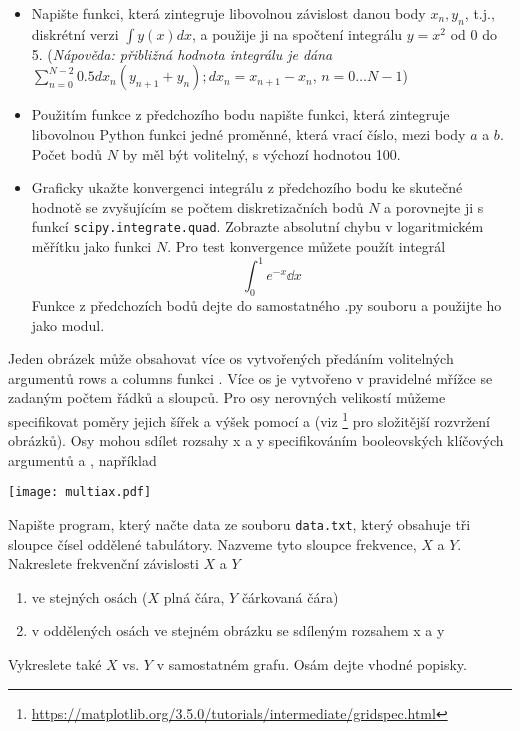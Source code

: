 \begin{exercise}
    \begin{itemize}
    \item Napište funkci, která zintegruje libovolnou závislost danou body $x_n, y_n$, t.j., diskrétní verzi $\int y(x)dx$, a použije ji na spočtení integrálu $y = x^2$ od 0 do 5. (\emph{Nápověda: přibližná hodnota integrálu je dána $\sum_{n=0}^{N-2} 0.5 dx_n(y_{n+1} + y_n); dx_n = x_{n+1} - x_n$}, $n = 0 \dots N-1$)

    \item Použitím funkce z předchozího bodu napište funkci, která zintegruje libovolnou Python funkci jedné proměnné, která vrací číslo, mezi body $a$ a $b$. Počet bodů $N$ by měl být volitelný, s výchozí hodnotou 100.

    \item Graficky ukažte konvergenci integrálu z předchozího bodu ke skutečné hodnotě se zvyšujícím se počtem diskretizačních bodů $N$ a porovnejte ji s funkcí \verb|scipy.integrate.quad|. Zobrazte absolutní chybu v logaritmickém měřítku jako funkci $N$. Pro test konvergence můžete použít integrál
    \[ \int_0^1 e^{-x} \dd x \]
    Funkce z předchozích bodů dejte do samostatného .py souboru a použijte ho jako modul.
    \end{itemize}
\end{exercise}

Jeden obrázek může obsahovat více os vytvořených předáním volitelných argumentů rows a columns funkci . Více os je vytvořeno v pravidelné mřížce se zadaným počtem řádků a sloupců. Pro osy nerovných velikostí můžeme specifikovat poměry jejich šířek a výšek pomocí  a  (viz  \footnote{\url{https://matplotlib.org/3.5.0/tutorials/intermediate/gridspec.html}} pro složitější rozvržení obrázků). Osy mohou sdílet rozsahy x a y specifikováním booleovských klíčových argumentů  a , například

\begin{center}
    \texttt{[image: multiax.pdf]}
\end{center}
\begin{exercise}
    \label{ex:peak}
    Napište program, který načte data ze souboru \verb|data.txt|, který obsahuje tři sloupce čísel oddělené tabulátory. Nazveme tyto sloupce frekvence, $X$ a $Y$. Nakreslete frekvenční závislosti $X$ a $Y$
    \begin{enumerate}
        \item ve stejných osách ($X$ plná čára, $Y$ čárkovaná čára)
        \item v oddělených osách ve stejném obrázku se sdíleným rozsahem x a y
    \end{enumerate}
    Vykreslete také $X$ vs. $Y$ v samostatném grafu. Osám dejte vhodné popisky.
\end{exercise}

